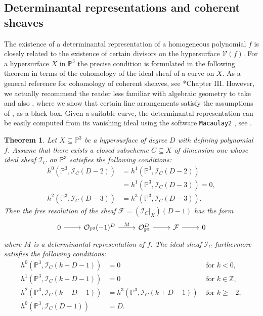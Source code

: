 \documentclass[a4paper,10pt]{amsart}
\theoremstyle{definition}
\theoremstyle{plain}
\newtheorem{thm}[Def]{Theorem}
\newcommand{\cF}{{\mathcal F}}
\newcommand{\cI}{{\mathcal I}}
\newcommand{\cO}{{\mathcal O}}
\newcommand{\pp}{\mathbb{P}}
\newcommand{\Z}{{\mathbb Z}}
\begin{document}
\subsection{Determinantal representations and coherent sheaves}
The existence of a determinantal representation of a homogeneous polynomial $f$ is closely related to the existence of certain divisors on the hypersurface $\mathcal{V}(f)$. For a hypersurface $X$ in $\pp^3$ the precise condition is formulated in the following theorem in terms of the cohomology of the ideal sheaf of a curve on $X$. As a general reference for cohomology of coherent sheaves, see \cite{Hartshorne1977AG}*{Chapter III}. However, we actually recommend the reader less familiar with algebraic geometry to take  and also , where we show that certain line arrangements satisfy the assumptions of , as a black box. Given a suitable curve, the determinantal representation can be easily computed from its vanishing ideal using the software \texttt{Macaulay2} \cite{M2}, see .
\begin{thm}\label{thm:idealsheafdetrep}
    Let $X\subseteq\pp^3$ be a hypersurface of degree $D$ with defining polynomial~$f$. Assume that there exists a closed subscheme  $C\subseteq X$ of dimension one whose ideal sheaf $\cI_C$ on $\pp^3$ satisfies the following conditions:
    \begin{align*}
        h^0(\pp^3,\cI_C(D-2))&=h^1(\pp^3,\cI_C(D-2))\\
        &=h^1(\pp^3,\cI_C(D-3))=0,\\
        h^2(\pp^3,\cI_C(D-3))&=h^3(\pp^3,\cI_C(D-3)).
    \end{align*}
    Then the free resolution of the sheaf $\cF=(\cI_C|_X)(D-1)$ has the form
    \begin{equation*}
    \begin{tikzcd}
        0\arrow{r}&\cO_{\pp^3}(-1)^D\arrow[r,"M"]&\cO_{\pp^3}^D\arrow{r}&\cF\arrow{r}&0
    \end{tikzcd}
    \end{equation*}
    where $M$ is a determinantal representation of $f$.    
    The ideal sheaf $\cI_C$ furthermore satisfies the following conditions:
     \begin{align*}
        h^0(\pp^3,\cI_C(k+D-1))&=0&\textrm{ for }k<0,\\
        h^1(\pp^3,\cI_C(k+D-1))&=0&\textrm{ for }k\in\Z,\\
        h^2(\pp^3,\cI_C(k+D-1))&=h^3(\pp^3,\cI_C(k+D-1))&\textrm{ for }k\geq-2,\\
        h^0(\pp^3,\cI_C(D-1))&=D.
    \end{align*}
\end{thm}
\end{document}
